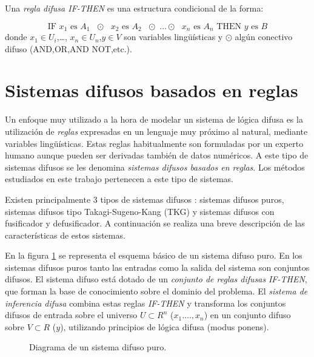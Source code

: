 \begin{definition}
Una \emph{regla difusa IF-THEN} es una estructura condicional de la forma:

\begin{equation}
\text{IF $x_{1}$ es $A_{1}$ $\odot$ $x_{2}$ es $A_{2}$ $\odot$ \ldots $\odot$ $x_{n}$ es $A_{n}$ THEN $y$ es $B$}
\end{equation}
donde $x_{1} \in U_{i}$,\ldots, $x_{n} \in U_{n}$,$y \in V$ son variables lingüísticas y $\odot$ algún conectivo difuso (AND,OR,AND NOT,etc.).
\end{definition}

\section{Sistemas difusos basados en reglas}\label{sec:sistemas-difusos-basados-en-reglas}
Un enfoque muy utilizado a la hora de modelar un sistema de lógica difusa es la utilización de \emph{reglas} expresadas en un lenguaje muy próximo al natural, mediante variables lingüísticas. Estas reglas habitualmente son formuladas por un experto humano aunque pueden ser derivadas también de datos numéricos. A este tipo de sistemas difusos se les denomina \emph{sistemas difusos basados en reglas}. Los métodos estudiados en este trabajo pertenecen a este tipo de sistemas.

Existen principalmente 3 tipos de sistemas difusos \cite{wang1997}: sistemas difusos puros, sistemas difusos tipo Takagi-Sugeno-Kang (TKG) y sistemas difusos con fusificador y defusificador. A continuación se realiza una breve descripción de las características de estos sistemas.

En la figura \ref{fig:pure-fuzzy-system} se representa el esquema básico de un sistema difuso puro. En los sistemas difusos puros tanto las entradas como la salida del sistema son conjuntos difusos. El sistema difuso está dotado de un \emph{conjunto de reglas difusas} \emph{IF-THEN}, que forman la base de conocimiento sobre el dominio del problema. El \emph{sistema de inferencia difusa} combina estas reglas \emph{IF-THEN} y transforma los conjuntos difusos de entrada sobre el universo $U \subset R^{n}$ ($x_{1}.\ldots,x_{n}$) en un conjunto difuso sobre $V \subset R$ ($y$), utilizando principios de lógica difusa (modus ponens).

\begin{figure}[tb]
	\centering
	
	\caption{Diagrama de un sistema difuso puro.}
	\label{fig:pure-fuzzy-system}
\end{figure}

